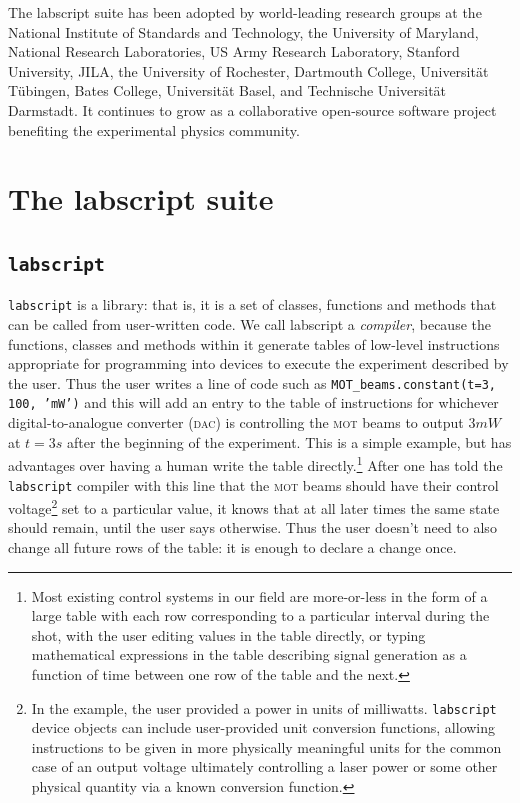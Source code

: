 The labscript suite has been adopted by world-leading research groups at the National Institute of Standards and Technology, the University of Maryland, National Research Laboratories, US Army Research Laboratory, Stanford University, JILA, the University of Rochester, Dartmouth College, Universit\"at T\"ubingen, Bates College, Universit\"at Basel, and Technische Universit\"at Darmstadt. It continues to grow as a collaborative open-source software project benefiting the experimental physics community.


\section{The labscript suite}


\subsection{\texttt{labscript}}

\texttt{labscript} is a library: that is, it is a set of classes, functions and methods that can be called from user-written code. We call labscript a \emph{compiler}, because the functions, classes and methods within it generate tables of low-level instructions appropriate for programming into devices to execute the experiment described by the user. Thus the user writes a line of code such as \hbox{\texttt{MOT\_beams.constant(t=3, 100, 'mW')}} and this will add an entry to the table of instructions for whichever digital-to-analogue converter (\textsc{dac}) is controlling the \textsc{mot} beams to output $3\unit{mW}$ at $t = 3\unit{s}$ after the beginning of the experiment. This is a simple example, but has advantages over having a human write the table directly.\footnote{Most existing control systems in our field are more-or-less in the form of a large table with each row corresponding to a particular interval during the shot, with the user editing values in the table directly, or typing mathematical expressions in the table describing signal generation as a function of time between one row of the table and the next.} After one has told the \texttt{labscript} compiler with this line that the \textsc{mot} beams should have their control voltage\footnote{In the example, the user provided a power in units of milliwatts. \texttt{labscript} device objects can include user-provided unit conversion functions, allowing instructions to be given in more physically meaningful units for the common case of an output voltage ultimately controlling a laser power or some other physical quantity via a known conversion function.} set to a particular value, it knows that at all later times the same state should remain, until the user says otherwise. Thus the user doesn't need to also change all future rows of the table: it is enough to declare a change once. 

